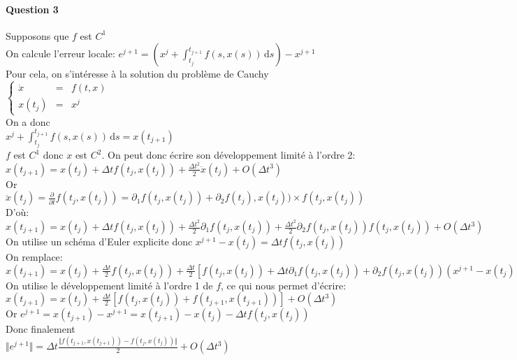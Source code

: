 \documentclass{article}
\begin{document}
\paragraph{Question 3} 

Supposons que $f$ est $C^{1}$ \\

On calcule l'erreur locale: $e^{j+1} = (x^{j}+ \int_{t_{j}}^{t_{j+1}} f(s,x(s)) \, \mathrm{d}s ) - x^{j+1}$ \\
Pour cela, on s'intéresse à la solution du problème de Cauchy 
$\left \{
\begin{array}{rcl}
\dot x&=&f(t,x) \\
x(t_{j})&=&x^{j}
\end{array}
\right.$ \\

On a donc \\$x^{j}+ \int_{t_{j}}^{t_{j+1}} f(s,x(s)) \, \mathrm{d}s = x(t_{j+1})$\\

$f$ est $C^{1}$ donc $x$ est $C^{2}$. On peut donc écrire son développement limité à l'ordre 2: \\

$x(t_{j+1}) = x(t_{j}) + \Delta t f(t_{j}, x(t_{j})) + \frac{\Delta t^{2}} {2} \ddot{x} (t_{j}) + O(\Delta t^{3})$ \\

Or $\ddot{x} (t_{j}) = \frac{ \partial }{ \partial t} f(t_{j}, x(t_{j})) = \partial _{1}f(t_{j},x(t_{j})) + \partial _{2} f(t_{j}), x(t_{j})) \times f(t_{j}, x(t_{j}))$\\

D'où: \\

$x(t_{j+1}) = x(t_{j}) + \Delta t f(t_{j}, x(t_{j})) + \frac{\Delta t^{2}} {2}  \partial _{1} f(t_{j}, x(t_{j})) + \frac{\Delta t^{2}} {2} \partial _{2} f(t_{j}, x(t_{j})) f(t_{j}, x(t_{j})) + O(\Delta t^{3})$ \\

On utilise un schéma d'Euler explicite donc $x^{j+1} - x(t_{j}) = \Delta t f(t_{j}, x(t_{j}))$\\
On remplace:\\

$x(t_{j+1}) = x(t_{j}) + \frac{\Delta t } {2} f(t_{j}, x(t_{j})) + \frac{\Delta t} {2} \left[  f(t_{j}, x(t_{j})) + \Delta t \partial _{1} f(t_{j}, x(t_{j})) + \partial _{2} f(t_{j}, x(t_{j})) (x^{j+1} - x(t_{j}))\right] + O(\Delta t^{3})$ \\

On utilise le développement limité à l'ordre 1 de $f$, ce qui nous permet d'écrire: \\

$x(t_{j+1}) = x(t_{j}) + \frac{\Delta t} {2} \left[ f(t_{j}, x(t_{j})) + f(t_{j+1}, x(t_{j+1})) \right]  + O(\Delta t^{3}) $\\

Or $e^{j+1} = x(t_{j+1}) - x^{j+1} = x(t_{j+1})-x(t_{j}) - \Delta t f(t_{j}, x(t_{j}))$ \\

Donc finalement\\

$\Vert e^{j+1} \Vert = \Delta t \frac{\Vert f(t_{j+1}, x(t_{j+1})) - f(t_{j}, x(t_{j}))\Vert} {2} + O(\Delta t^{3}) $
\end{document}

